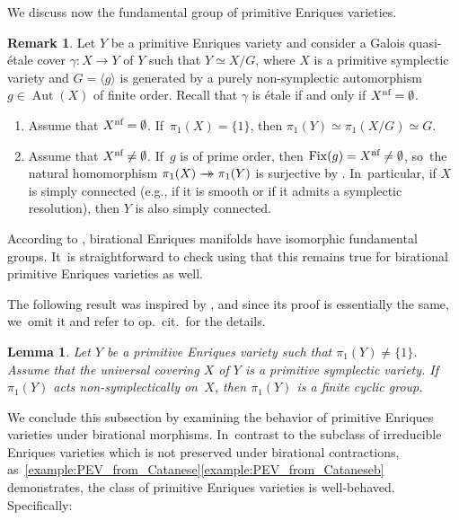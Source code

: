 \documentclass[JEP,XML,SOM,Unicode,published]{cedram}
\newcommand{\onto}{\mathchoice{\to\hspace*{-5mm}\to}{\mathrel{\hbox{$\to\hspace*{-2.85mm}\to$}}}{\to\hspace*{-3mm}\to}{\to\hspace*{-3mm}\to}}
\theoremstyle{plain}
\newtheorem{lem}[thm]{Lemma}
\theoremstyle{definition}
\newtheorem{rem}[thm]{Remark}
\DeclareMathOperator{\Aut}{Aut}
\DeclareMathOperator{\Fix}{Fix}
\begin{document}
We discuss now the fundamental group of primitive Enriques varieties.

\begin{rem}
\label{rem:fundamental_group_PEV}
Let $Y$ be a primitive Enriques variety and consider a Galois quasi-étale cover $\gamma \colon X \to Y$ of $Y$ such that $Y\simeq X/G$, where $X$ is a primitive symplectic variety and $G = \langle g \rangle$ is generated by a purely non-symplectic automorphism $g \in \Aut(X)$ of finite order. Recall that $\gamma$ is étale if and only if $X^\textup{nf} = \emptyset$.
\begin{enumerate}
\item\label{rem:fundamental_group_PEVi}
Assume that $X^\textup{nf} = \emptyset$. If~$\pi_1(X) = \{ 1 \}$, then $\pi_1(Y) \simeq \pi_1(X/G) \simeq G$.

\item\label{rem:fundamental_group_PEVii}
Assume that $X^\textup{nf} \neq \emptyset$. If~$g$ is of prime order, then $\Fix(g) = X^\textup{nf} \neq \emptyset$, so~the natural homomorphism $\pi_1(X) \onto \pi_1(Y)$ is surjective by \cite[Lem.\,1.2]{Fujiki83b}. In~particular, if $X$ is simply connected (e.g., if it is smooth or if it admits a symplectic resolution), then $Y$ is also simply connected.
\end{enumerate}
\end{rem}

According to \cite[Prop.\,2.10]{OS11a}, birational Enriques manifolds have isomorphic fundamental groups. It~is straightforward to check using \cite[Th.\,1.1]{Tak03} that this remains true for birational primitive Enriques varieties as well.

The following result was inspired by \cite[Prop.\,5.11]{BCS24}, and since its proof is essentially the same, we~omit it and refer to op.\ cit.\ for the details.

\begin{lem}
Let $Y$ be a primitive Enriques variety such that $\pi_1(Y) \neq \{ 1 \}$. Assume that the universal covering $X$ of $Y$ is a primitive symplectic variety. If~$\pi_1(Y)$ acts non-symplectically on~$X$, then $\pi_1(Y)$ is a finite cyclic group.
\end{lem}

We conclude this subsection by examining the behavior of primitive Enriques varieties under birational morphisms. In~contrast to the subclass of irreducible Enriques varieties which is not preserved under birational contractions, as~\autoref{example:PEV_from_Catanese}\eqref{example:PEV_from_Cataneseb} demonstrates, the class of primitive Enriques varieties is well-behaved. Specifically:
\end{document}

